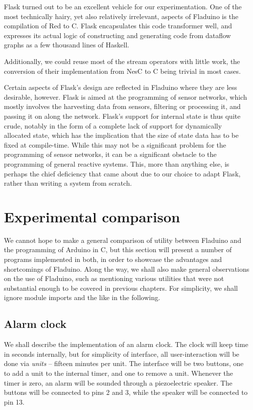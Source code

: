 \documentclass[a4paper, oneside, final]{memoir}
\begin{document}
Flask turned out to be an excellent vehicle for our experimentation.
One of the most technically hairy, yet also relatively irrelevant,
aspects of Fladuino is the compilation of Red to C.  Flask
encapsulates this code transformer well, and expresses its actual
logic of constructing and generating code from dataflow graphs as a
few thousand lines of Haskell.

Additionally, we could reuse most of the stream operators with little
work, the conversion of their implementation from NesC to C being
trivial in most cases.

Certain aspects of Flask's design are reflected in Fladuino where they
are less desirable, however.  Flask is aimed at the programming of
sensor networks, which mostly involves the harvesting data from
sensors, filtering or processing it, and passing it on along the
network.  Flask's support for internal state is thus quite crude,
notably in the form of a complete lack of support for dynamically
allocated state, which has the implication that the size of state data
has to be fixed at compile-time.  While this may not be a significant
problem for the programming of sensor networks, it can be a
significant obstacle to the programming of general reactive systems.
This, more than anything else, is perhaps the chief deficiency that
came about due to our choice to adapt Flask, rather than writing a
system from scratch.

\section{Experimental comparison}

We cannot hope to make a general comparison of utility between
Fladuino and the programming of Arduino in C, but this section will
present a number of programs implemented in both, in order to showcase
the advantages and shortcomings of Fladuino.  Along the way, we shall
also make general observations on the use of Fladuino, such as
mentioning various utilities that were not substantial enough to be
covered in previous chapters.  For simplicity, we shall ignore module
imports and the like in the following.

\subsection{Alarm clock}

We shall describe the implementation of an alarm clock.  The clock
will keep time in seconds internally, but for simplicity of interface,
all user-interaction will be done via \textit{units} -- fifteen
minutes per unit.  The interface will be two buttons, one to add a
unit to the internal timer, and one to remove a unit.  Whenever the
timer is zero, an alarm will be sounded through a piezoelectric
speaker.  The buttons will be connected to pins 2 and 3, while the
speaker will be connected to pin 13.
\end{document}
